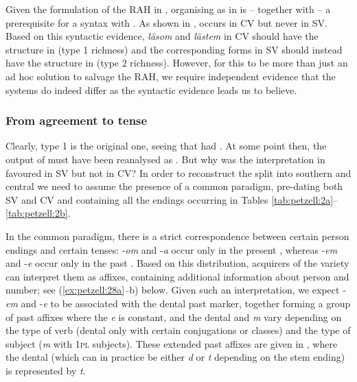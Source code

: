 \documentclass[output=paper,colorlinks,citecolor=brown,draft,draftmode]{langscibook}
\begin{document}
Given the formulation of the RAH in , organising  as in  is – together with  – a prerequisite for a syntax with . As shown in ,  occurs in CV but never in SV. Based on this syntactic evidence, \textit{läsom} and \textit{lästem} in CV should have the structure in  (type 1 richness) and the corresponding forms in SV should instead have the structure in  (type 2 richness). However, for this to be more than just an ad hoc solution to salvage the RAH, we require independent evidence that the  systems do indeed differ as the syntactic evidence leads us to believe.


\subsubsection{From agreement to tense}\label{sec:petzell:4.3.2}\largerpage


Clearly, type 1  is the original one, seeing that  had . At some point then, the output of  must have been reanalysed as . But why was the interpretation in  favoured in SV but not in CV? In order to reconstruct the split into southern and central  we need to assume the presence of a common paradigm, pre-dating both SV and CV and containing all the endings occurring in Tables \ref{tab:petzell:2a}–\ref{tab:petzell:2b}.



In the common  paradigm, there is a strict correspondence between certain person endings and certain tenses: -\textit{om} and -\textit{a} occur only in the present , whereas -\textit{em} and -\textit{e} occur only in the past . Based on this distribution, acquirers of the variety can interpret them as  affixes, containing additional information about person and number; see (\ref{ex:petzell:28a}–b) below. Given such an interpretation, we expect -\textit{em} and -\textit{e} to be associated with the dental past  marker, together forming a group of past  affixes where the \textit{e} is constant, and the dental and \textit{m} vary depending on the type of verb (dental only with certain conjugations or classes) and the type of subject (\textit{m} with 1\textsc{pl} subjects). These extended past  affixes are given in , where the dental (which can in practice be either \textit{d} or \textit{t} depending on the stem ending) is represented by \textit{t}.
\end{document}
